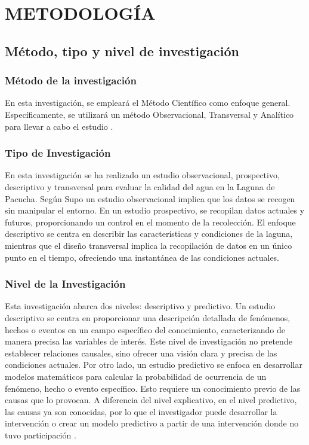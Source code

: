 \chapter{METODOLOGÍA} 
\section{ Método, tipo y nivel de investigación}

\subsection{Método de la investigación}
En esta investigación, se empleará el Método Científico como enfoque general. Específicamente, se utilizará un método Observacional, Transversal y Analítico para llevar a cabo el estudio \cite{popper1934}.

\subsection{Tipo de Investigación}

En esta investigación se ha realizado un estudio observacional, prospectivo, descriptivo y transversal para evaluar la calidad del agua en la Laguna de Pacucha. Según Supo \cite{supo2020} un estudio observacional implica que los datos se recogen sin manipular el entorno. En un estudio prospectivo, se recopilan datos actuales y futuros, proporcionando un control en el momento de la recolección. El enfoque descriptivo se centra en describir las características y condiciones de la laguna, mientras que el diseño transversal implica la recopilación de datos en un único punto en el tiempo, ofreciendo una instantánea de las condiciones actuales.

\subsection{Nivel de la Investigación}

Esta investigación abarca dos niveles: descriptivo y predictivo. Un estudio descriptivo se centra en proporcionar una descripción detallada de fenómenos, hechos o eventos en un campo específico del conocimiento, caracterizando de manera precisa las variables de interés. Este nivel de investigación no pretende establecer relaciones causales, sino ofrecer una visión clara y precisa de las condiciones actuales. Por otro lado, un estudio predictivo se enfoca en desarrollar modelos matemáticos para calcular la probabilidad de ocurrencia de un fenómeno, hecho o evento específico. Esto requiere un conocimiento previo de las causas que lo provocan. A diferencia del nivel explicativo, en el nivel predictivo, las causas ya son conocidas, por lo que el investigador puede desarrollar la intervención o crear un modelo predictivo a partir de una intervención donde no tuvo participación \cite{supo2020}.

